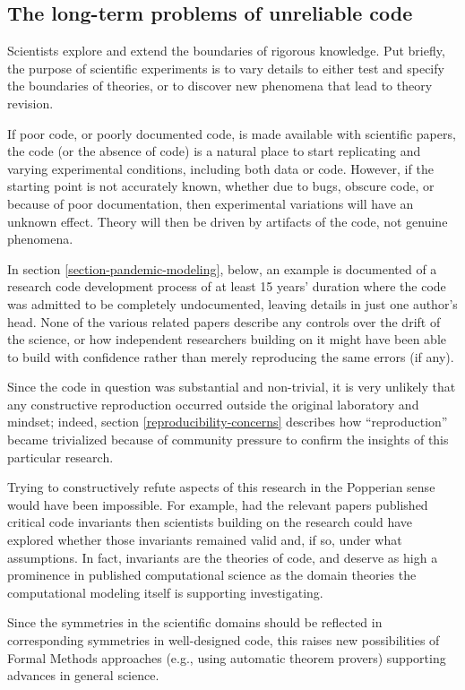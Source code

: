 \documentclass{comjnl}
\begin{document}
\begin{change}
\subsection{The long-term problems of unreliable code}
Scientists explore and extend the boundaries of rigorous knowledge. Put briefly, the purpose of scientific experiments is to vary details to either test and specify the boundaries of theories, or to discover new phenomena that lead to theory revision. 

If poor code, or poorly documented code, is made available with scientific papers, the code (or the absence of code) is a natural place to start replicating and varying experimental conditions,  including both data or code. However, if the starting point is not accurately known, whether due to bugs, obscure code, or because of poor documentation, then experimental variations will have an unknown effect. Theory will then be driven by artifacts of the code, not genuine phenomena. 

In section \ref{section-pandemic-modeling}, below, an example is documented of a research code development process of at least 15 years' duration where the code was admitted to be completely undocumented, leaving details in just one author's head. None of the various related papers describe any controls over the drift of the science, or how independent researchers building on it might have been able to build with confidence rather than merely reproducing the same errors (if any). 

Since the code in question was substantial and non-trivial, it is very unlikely that any constructive reproduction occurred outside the original laboratory and mindset; indeed, section \ref{reproducibility-concerns} describes how ``reproduction'' became trivialized because of community pressure to confirm the insights of this particular research. 

Trying to constructively refute aspects of this research in the Popperian sense \cite{popper-conjectures-refutations} would have been impossible. For example, had the relevant papers published critical code invariants then scientists building on the research could have explored whether those invariants remained valid and, if so, under what assumptions. In fact, invariants are the theories of code, and deserve as high a prominence in published computational science as the domain theories the computational modeling itself is supporting investigating. 

Since the symmetries in the scientific domains should be reflected in corresponding symmetries in well-designed code, this raises new possibilities of Formal Methods approaches (e.g., using automatic theorem provers) supporting advances in general science.
\end{change}
\end{document}
